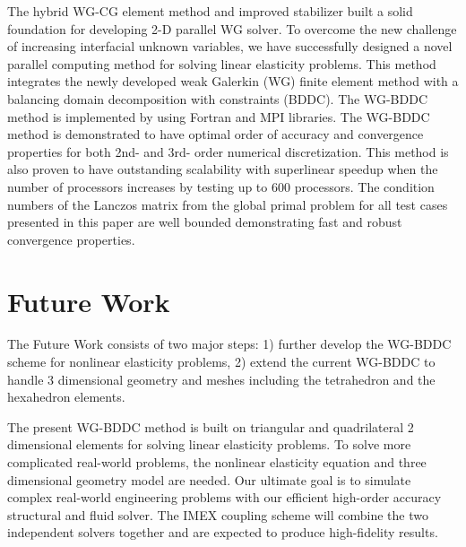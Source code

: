 The hybrid WG-CG element method and improved stabilizer built a solid foundation for developing 2-D parallel WG solver. To overcome the new challenge of increasing interfacial unknown variables, we have successfully designed a novel parallel computing method for solving linear elasticity problems. This method integrates the newly developed weak Galerkin (WG) finite element method with a balancing domain decomposition with constraints (BDDC). The WG-BDDC method is implemented by using Fortran and MPI libraries. The WG-BDDC method is demonstrated to have optimal order of accuracy and convergence properties for both 2nd- and 3rd- order numerical discretization. This method is also proven to have outstanding scalability with superlinear speedup when the number of processors increases by testing up to 600 processors. The condition numbers of the Lanczos matrix from the global primal problem for all test cases presented in this paper are well bounded demonstrating fast and robust convergence properties.


\section{Future Work}

The Future Work consists of two major steps: 1) further develop the WG-BDDC scheme for nonlinear elasticity problems, 2) extend the current WG-BDDC to handle 3 dimensional geometry and meshes including the tetrahedron and the hexahedron elements.


The present WG-BDDC method is built on triangular and quadrilateral 2 dimensional elements for solving linear elasticity problems. To solve more complicated real-world problems, the nonlinear elasticity equation and three dimensional geometry model are needed. Our ultimate goal is to simulate complex real-world engineering problems with our efficient high-order accuracy structural and fluid solver. The IMEX coupling scheme will combine the two independent solvers together and are expected to produce high-fidelity results.